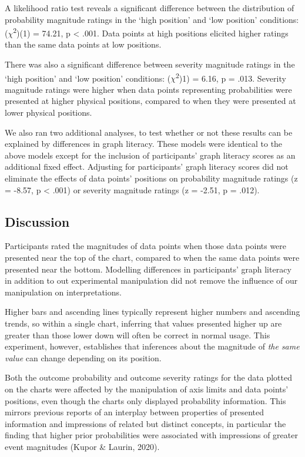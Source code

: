 \documentclass[journal]{vgtc}                %
\begin{document}
A likelihood ratio test reveals a significant difference between the distribution of probability magnitude ratings in the `high position' and `low position' conditions: (\(\chi\)\textsuperscript{2})(1) = 74.21, p \textless{} .001. Data points at high positions elicited higher ratings than the same data points at low positions.

There was also a significant difference between severity magnitude ratings in the `high position' and `low position' conditions: (\(\chi\)\textsuperscript{2})1) = 6.16, p = .013. Severity magnitude ratings were higher when data points representing probabilities were presented at higher physical positions, compared to when they were presented at lower physical positions.

We also ran two additional analyses, to test whether or not these results can be explained by differences in graph literacy. These models were identical to the above models except for the inclusion of participants' graph literacy scores as an additional fixed effect. Adjusting for participants' graph literacy scores did not eliminate the effects of data points' positions on probability magnitude ratings (z = -8.57, p \textless{} .001) or severity magnitude ratings (z = -2.51, p = .012).

\hypertarget{discussion}{%
\subsection{Discussion}\label{discussion}}

Participants rated the magnitudes of data points when those data points were presented near the top of the chart, compared to when the same data points were presented near the bottom. Modelling differences in participants' graph literacy in addition to out experimental manipulation did not remove the influence of our manipulation on interpretations.~

Higher bars and ascending lines typically represent higher numbers and ascending trends, so within a single chart, inferring that values presented higher up are greater than those lower down will often be correct in normal usage. This experiment, however, establishes that inferences about the magnitude of \emph{the same value} can change depending on its position.

Both the outcome probability and outcome severity ratings for the data plotted on the charts were affected by the manipulation of axis limits and data points' positions, even though the charts only displayed probability information. This mirrors previous reports of an interplay between properties of presented information and impressions of related but distinct concepts, in particular the finding that higher prior probabilities were associated with impressions of greater event magnitudes (Kupor \& Laurin, 2020).
\end{document}
